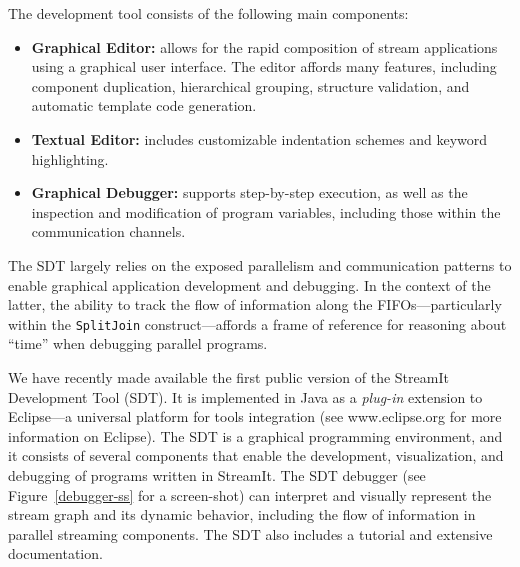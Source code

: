 \documentclass{csailabstractbook}
\begin{document}
The  development  tool consists  of the following main components:
\begin{itemize}
\item {\bf Graphical Editor:} allows for the rapid composition of
stream applications using a graphical user interface. The editor
affords many features, including  component duplication, hierarchical
grouping, structure validation, and automatic template code generation.
\item {\bf Textual Editor:} includes customizable indentation
schemes and keyword highlighting.
\item {\bf Graphical Debugger:} supports step-by-step execution, as well as
the inspection and modification  of program variables, including those
within the communication channels.
\end{itemize}

The  SDT largely relies  on the  exposed parallelism  and communication
patterns to enable graphical application development and debugging. In
the  context  of  the  latter,  the  ability  to  track  the  flow  of
information along the  FIFOs---particularly within the {\tt SplitJoin}
construct---affords a frame of  reference for reasoning about ``time''
when debugging parallel programs.





We  have recently  made  available  the first  public  version of  the
StreamIt Development Tool (SDT).  It  is implemented in Java as a {\it
plug-in}  extension  to   Eclipse---a  universal  platform  for  tools
integration  (see www.eclipse.org  for more  information  on Eclipse).
The SDT  is a  graphical programming environment,  and it  consists of
several  components that  enable the  development,  visualization, and
debugging  of programs  written in  StreamIt.  The  SDT  debugger (see
Figure~\ref{debugger-ss} for a  screen-shot) can interpret and visually
represent  the stream graph  and its  dynamic behavior,  including the
flow of  information in parallel  streaming components.  The  SDT also
includes a tutorial and extensive documentation.
\end{document}
